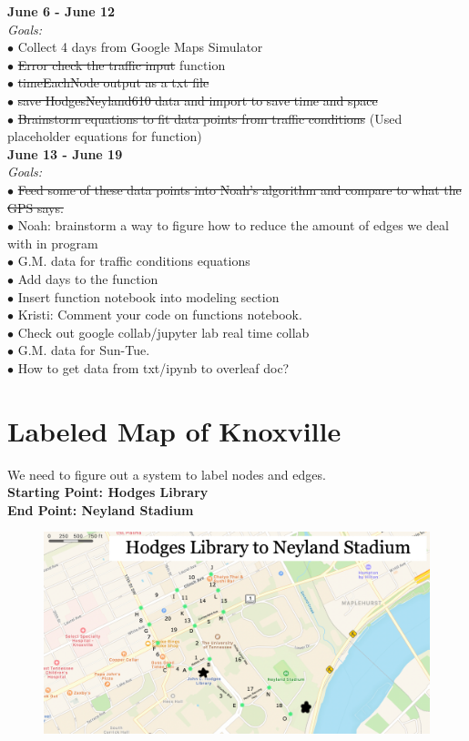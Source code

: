 \documentclass{article}
\begin{document}
\large\textbf{June 6 - June 12}\\
\normalsize\textit{Goals:} \\
$\bullet$ Collect 4 days from Google Maps Simulator \\
$\bullet$ \sout{Error check the traffic input} function \\
$\bullet$ \sout{timeEachNode output as a txt file} \\
$\bullet$ \sout{save HodgesNeyland610 data and import to save time and space} \\
$\bullet$ \sout{Brainstorm equations to fit data points from traffic conditions} (Used placeholder equations for function) \\

\large\textbf{June 13 - June 19} \\
\normalsize\textit{Goals:} \\
$\bullet$ \sout{Feed some of these data points into Noah's algorithm and compare to what the GPS says.} \\
$\bullet$ Noah: brainstorm a way to figure how to reduce the amount of edges we deal with in program \\
$\bullet$ G.M. data for traffic conditions equations\\
$\bullet$ Add days to the function\\
$\bullet$ Insert function notebook into modeling section \\
$\bullet$ Kristi: Comment your code on functions notebook. \\
$\bullet$ Check out google collab/jupyter lab real time collab \\
$\bullet$ G.M. data for Sun-Tue. \\
$\bullet$ How to get data from txt/ipynb to overleaf doc? \\

\normalsize
\newpage
\section{Labeled Map of Knoxville}
We need to figure out a system to label nodes and edges. \\
\textbf{Starting Point: Hodges Library \\
End Point: Neyland Stadium} \\

\begin{figure}[htp]
\centering\includegraphics[width=6in]{Hodges Neyland.jpg}
\end{figure}
\end{document}
